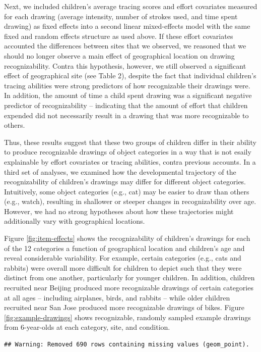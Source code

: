 \documentclass[
  english,
  man]{apa6}
\begin{document}
Next, we included children's average tracing scores and effort covariates measured for each drawing (average intensity, number of strokes used, and time spent drawing) as fixed effects into a second linear mixed-effects model with the same fixed and random effects structure as used above. If these effort covariates accounted the differences between sites that we observed, we reasoned that we should no longer observe a main effect of geographical location on drawing recognizability. Contra this hypothesis, however, we still observed a significant effect of geographical site (see Table 2), despite the fact that individual children's tracing abilities were strong predictors of how recognizable their drawings were. In addition, the amount of time a child spent drawing was a significant negative predictor of recognizability -- indicating that the amount of effort that children expended did not necessarily result in a drawing that was more recognizable to others.

Thus, these results suggest that these two groups of children differ in their ability to produce recognizable drawings of object categories in a way that is not esaily explainable by effort covariates or tracing abilities, contra previous accounts. In a third set of analyses, we examined how the developmental trajectory of the recognizability of children's drawings may differ for different object categories. Intuitively, some object categories (e.g., cat) may be easier to draw than others (e.g., watch), resulting in shallower or steeper changes in recognizability over age. However, we had no strong hypotheses about how these trajectories might additionally vary with geographical locations.

Figure \ref{fig:item-effects} shows the recognizability of children's drawings for each of the 12 categories a function of geographical location and children's age and reveal considerable variability. For example, certain categories (e.g., cats and rabbits) were overall more difficult for children to depict such that they were distinct from one another, particularly for younger children. In addition, children recruited near Beijing produced more recognizable drawings of certain categories at all ages -- including airplanes, birds, and rabbits -- while older children recruited near San Jose produced more recognizable drawings of bikes. Figure \ref{fig:example-drawings} shows recognizable, randomly sampled example drawings from 6-year-olds at each category, site, and condition.

\begin{verbatim}
## Warning: Removed 690 rows containing missing values (geom_point).
\end{verbatim}
\end{document}
